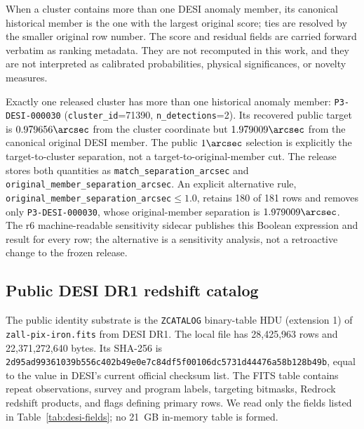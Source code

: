 \documentclass[twocolumn,linenumbers]{aastex702}
\begin{document}
When a cluster contains more than one DESI anomaly member, its canonical historical member is
the one with the largest original score; ties are resolved by the smaller original row number.
The score and residual fields are carried forward verbatim as ranking metadata.  They are not
recomputed in this work, and they are not interpreted as calibrated probabilities, physical
significances, or novelty measures.

Exactly one released cluster has more than one historical anomaly member:
\texttt{P3-DESI-000030} (\texttt{cluster\_id}=71390, \texttt{n\_detections}=2).  Its recovered
public target is $0.979656\arcsec$ from the cluster coordinate but $1.979009\arcsec$ from the
canonical original DESI member.  The public $1\arcsec$ selection is explicitly the target-to-cluster
separation, not a target-to-original-member cut.  The release stores both quantities as
\texttt{match\_separation\_arcsec} and \texttt{original\_member\_separation\_arcsec}.
An explicit alternative rule,
\texttt{original\_member\_separation\_arcsec}$\le1.0$, retains 180 of 181 rows and removes only
\texttt{P3-DESI-000030}, whose original-member separation is $1.979009\arcsec$.  The r6
machine-readable sensitivity sidecar publishes this Boolean expression and result for every row;
the alternative is a sensitivity analysis, not a retroactive change to the frozen release.

\subsection{Public DESI DR1 redshift catalog}\label{sec:desi-input}

The public identity substrate is the \texttt{ZCATALOG} binary-table HDU (extension 1) of
\texttt{zall-pix-iron.fits} from DESI DR1.  The local file has
28,425,963 rows and 22,371,272,640 bytes.  Its SHA-256 is
\texttt{2d95ad99361039b556c402b49e0e7c84\allowbreak df5f00106dc5731d44476a58b128b49b}, equal to the
value in DESI's current official checksum list.  The FITS table contains repeat observations,
survey and program labels, targeting bitmasks, Redrock redshift products, and flags defining
primary rows.  We read only the fields listed in Table~\ref{tab:desi-fields}; no 21~GB in-memory
table is formed.
\end{document}
